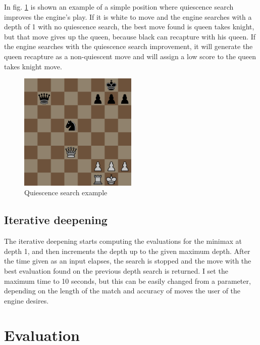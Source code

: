 
In fig. \ref{fig:quiescencePosition} is shown an example of a simple position where quiescence search improves the engine's play. If it is white to move and the engine searches with a depth of 1 with no quiescence search, the best move found is queen takes knight, but that move gives up the queen, because black can recapture with his queen. If the engine searches with the quiescence search improvement, it will generate the queen recapture as a non-quiescent move and will assign a low score to the queen takes knight move.

\begin{figure}[h]
    \centering
    \includegraphics[width=0.5\textwidth]{figures/quiescence-position.png}
    \caption{Quiescence search example}
    \label{fig:quiescencePosition}
\end{figure}

\subsection{Iterative deepening}
\label{subsec:ch4sec2subsec3}

The iterative deepening starts computing the evaluations for the minimax at depth 1, and then increments the depth up to the given maximum depth. After the time given as an input elapses, the search is stopped and the move with the best evaluation found on the previous depth search is returned. I set the maximum time to 10 seconds, but this can be easily changed from a parameter, depending on the length of the match and accuracy of moves the user of the engine desires.

\section{Evaluation}
\label{sec:ch4sec3}

